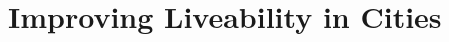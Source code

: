 \documentclass[../main]{subfiles}
\begin{document}
\section{Improving Liveability in Cities}
\end{document}
